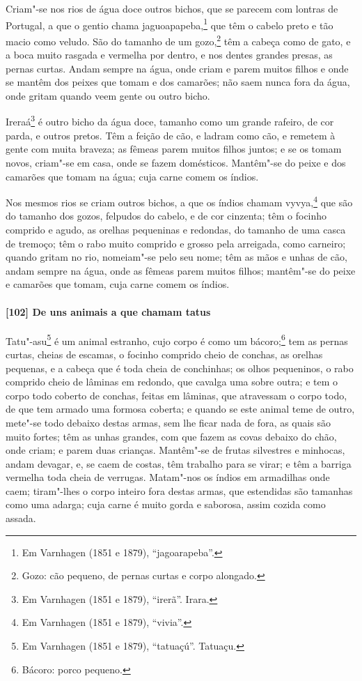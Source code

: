 Criam"-se nos rios de água doce outros bichos, que se parecem com lontras de Portugal, a
que o gentio chama jaguoapapeba,\footnote{ Em Varnhagen (1851 e 1879), ``jagoarapeba''.}
que têm o cabelo preto e tão macio como veludo. São do tamanho de um gozo,\footnote{ Gozo:
cão pequeno, de pernas curtas e corpo alongado.} têm a cabeça como de gato, e a boca
muito rasgada e vermelha por dentro, e nos dentes grandes presas, as pernas curtas. Andam
sempre na água, onde criam e parem muitos filhos e onde se mantêm dos peixes que tomam e
dos camarões; não saem nunca fora da água, onde gritam quando veem gente ou outro bicho.

Ireraá\footnote{ Em Varnhagen (1851 e 1879), ``irerã''. Irara.} é outro bicho da água
doce, tamanho como um grande rafeiro, de cor parda, e outros pretos. Têm a feição de cão,
e ladram como cão, e remetem à gente com muita braveza; as fêmeas parem muitos filhos
juntos; e se os tomam novos, criam"-se em casa, onde se fazem domésticos. Mantêm"-se do
peixe e dos camarões que tomam na água; cuja carne comem os índios.

Nos mesmos rios se criam outros bichos, a que os índios chamam vyvya,\footnote{ Em
Varnhagen (1851 e 1879), ``vivia''.} que são do tamanho dos gozos, felpudos do cabelo, e
de cor cinzenta; têm o focinho comprido e agudo, as orelhas pequeninas e redondas, do
tamanho de uma casca de tremoço; têm o rabo muito comprido e grosso pela arreigada, como
carneiro; quando gritam no rio, nomeiam"-se pelo seu nome; têm as mãos e unhas de cão,
andam sempre na água, onde as fêmeas parem muitos filhos; mantêm"-se do peixe e camarões
que tomam, cuja carne comem os índios.

\paragraph{[102] De uns animais a que chamam tatus}\quad
Tatu"-asu\footnote{ Em Varnhagen (1851 e 1879), ``tatuaçú''. Tatuaçu.} é um animal
estranho, cujo corpo é como um bácoro;\footnote{ Bácoro: porco pequeno.} tem as pernas
curtas, cheias de escamas, o focinho comprido cheio de conchas, as orelhas pequenas, e a
cabeça que é toda cheia de conchinhas; os olhos pequeninos, o rabo comprido cheio de
lâminas em redondo, que cavalga uma sobre outra; e tem o corpo todo coberto de conchas,
feitas em lâminas, que atravessam o corpo todo, de que tem armado uma formosa coberta; e
quando se este animal teme de outro, mete"-se todo debaixo destas armas, sem lhe ficar nada
de fora, as quais são muito fortes; têm as unhas grandes, com que fazem as covas debaixo
do chão, onde criam; e parem duas crianças. Mantêm"-se de frutas silvestres e minhocas,
andam devagar, e, se caem de costas, têm trabalho para se virar; e têm a barriga vermelha
toda cheia de verrugas. Matam"-nos os índios em armadilhas onde caem; tiram"-lhes o corpo
inteiro fora destas armas, que estendidas são tamanhas como uma adarga; cuja carne é muito
gorda e saborosa, assim cozida como assada.

